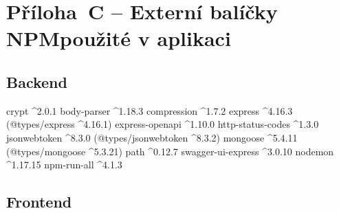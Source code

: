 \documentclass[a4paper,12pt]{article}
\begin{document}
\section*{Příloha~C --  Externí balíčky NPM\newline použité v aplikaci}

\subsection*{Backend}

crypt \textasciicircum2.0.1\newline
body-parser \textasciicircum1.18.3\newline
compression \textasciicircum1.7.2\newline
express \textasciicircum4.16.3 (@types/express \textasciicircum4.16.1)\newline
express-openapi \textasciicircum1.10.0\newline
http-status-codes \textasciicircum1.3.0\newline
jsonwebtoken \textasciicircum8.3.0 (@types/jsonwebtoken \textasciicircum8.3.2)\newline
mongoose \textasciicircum5.4.11 (@types/mongoose \textasciicircum5.3.21) \newline
path \textasciicircum0.12.7\newline
swagger-ui-express \textasciicircum3.0.10\newline
nodemon \textasciicircum1.17.15\newline
npm-run-all \textasciicircum4.1.3

\subsection*{Frontend}
\end{document}
